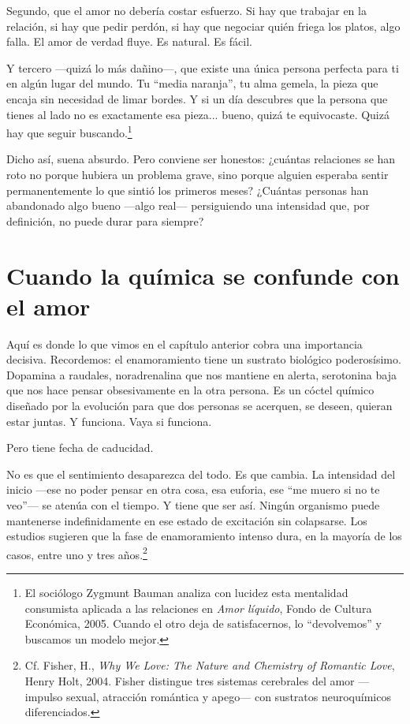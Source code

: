Segundo, que el amor no debería costar esfuerzo. Si hay que trabajar en la relación, si hay que pedir perdón, si hay que negociar quién friega los platos, algo falla. El amor de verdad fluye. Es natural. Es fácil.

Y tercero ---quizá lo más dañino---, que existe una única persona perfecta para ti en algún lugar del mundo. Tu ``media naranja'', tu alma gemela, la pieza que encaja sin necesidad de limar bordes. Y si un día descubres que la persona que tienes al lado no es exactamente esa pieza... bueno, quizá te equivocaste. Quizá hay que seguir buscando.\footnote{El sociólogo Zygmunt Bauman analiza con lucidez esta mentalidad consumista aplicada a las relaciones en \textit{Amor líquido}, Fondo de Cultura Económica, 2005. Cuando el otro deja de satisfacernos, lo ``devolvemos'' y buscamos un modelo mejor.}

Dicho así, suena absurdo. Pero conviene ser honestos: ¿cuántas relaciones se han roto no porque hubiera un problema grave, sino porque alguien esperaba sentir permanentemente lo que sintió los primeros meses? ¿Cuántas personas han abandonado algo bueno ---algo real--- persiguiendo una intensidad que, por definición, no puede durar para siempre?

\section{Cuando la química se confunde con el amor}

Aquí es donde lo que vimos en el capítulo anterior cobra una importancia decisiva. Recordemos: el enamoramiento tiene un sustrato biológico poderosísimo. Dopamina a raudales, noradrenalina que nos mantiene en alerta, serotonina baja que nos hace pensar obsesivamente en la otra persona. Es un cóctel químico diseñado por la evolución para que dos personas se acerquen, se deseen, quieran estar juntas. Y funciona. Vaya si funciona.

Pero tiene fecha de caducidad.

No es que el sentimiento desaparezca del todo. Es que cambia. La intensidad del inicio ---ese no poder pensar en otra cosa, esa euforia, ese ``me muero si no te veo''--- se atenúa con el tiempo. Y tiene que ser así. Ningún organismo puede mantenerse indefinidamente en ese estado de excitación sin colapsarse. Los estudios sugieren que la fase de enamoramiento intenso dura, en la mayoría de los casos, entre uno y tres años.\footnote{Cf. Fisher, H., \textit{Why We Love: The Nature and Chemistry of Romantic Love}, Henry Holt, 2004. Fisher distingue tres sistemas cerebrales del amor ---impulso sexual, atracción romántica y apego--- con sustratos neuroquímicos diferenciados.}

